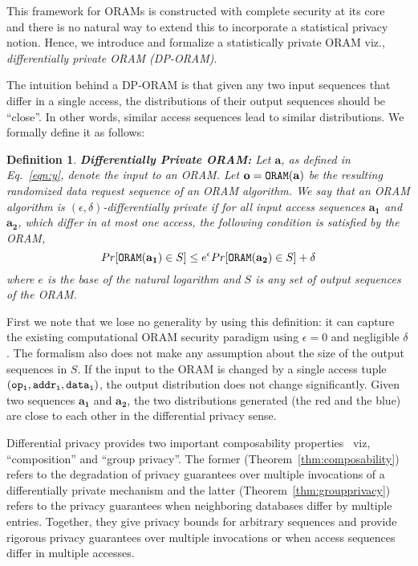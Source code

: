 \documentclass[USenglish,oneside,twocolumn]{article}
\makeatletter
\let\origsubsection\subsection
\renewcommand\subsection{\@ifstar{\starsubsection}{\nostarsubsection}}
\newcommand\nostarsubsection[1]
{\subsectionprelude\origsubsection{#1}\subsectionpostlude}
\newcommand\starsubsection[1]
{\subsectionprelude\origsubsection*{#1}\subsectionpostlude}
\newcommand\subsectionprelude{\vspace{-1.5em}}
\newcommand\subsectionpostlude{\vspace{-1em}}
\newtheorem{defn}{Definition}
\makeatother
\begin{document}
This framework for ORAMs is constructed with complete security at its core~\cite{pathoram,ringoram,gentryoramSC,burstoram} and there is no natural way to extend this to incorporate a statistical privacy notion. Hence, we introduce and formalize a statistically private ORAM viz., \emph{differentially private ORAM (DP-ORAM)}. 






\subsection{Formalizing DP-ORAM}

The intuition behind a DP-ORAM is that given any two input sequences that differ in a single access, the distributions of their output sequences should be ``close''. In other words, similar access sequences lead to similar distributions. We formally define it as follows:

\begin{defn}
\textbf{Differentially Private ORAM: } \textit{Let $\mathbf{a}$, as defined in Eq.~\ref{eqn:y}, denote the input to an ORAM. Let ${\mathbf{o} = \tt ORAM(\mathbf{a})}$ be the resulting randomized data request sequence of an ORAM algorithm. We say that an ORAM algorithm is $(\epsilon,\delta)$-differentially private if for all input access sequences $\mathbf{a_1}$ and $\mathbf{a_2}$, which differ in at most one access, the following condition is satisfied by the ORAM,
\begin{equation}\label{eqn:DPoram}
Pr[{\tt ORAM(\mathbf{a_1})} \in S] \leq e^{\epsilon} Pr[{\tt ORAM(\mathbf{a_2})} \in S] + \delta 
\end{equation}
where $e$ is the base of the natural logarithm and $S$ is any set of output sequences of the ORAM.}
\end{defn}

First we note that we lose no generality by using this definition: it can capture the existing computational ORAM security paradigm using $\epsilon = 0$ and negligible $\delta$. The formalism also does not make any assumption about the size of the output sequences in $S$. If the input to the ORAM is changed by a single access tuple ${\tt (op_{i},addr_{i},data_{i})}$, the output distribution does not change significantly. 
Given two sequences $\mathbf{a_1}$ and $\mathbf{a_2}$, the two distributions generated (the red and the blue) are close to each other in the differential privacy sense.

Differential privacy provides two important composability properties~\cite{differentialprivacy} viz, ``composition'' and ``group privacy''. The former (Theorem~\ref{thm:composability}) refers to the degradation of privacy guarantees over multiple invocations of a differentially private mechanism and the latter (Theorem~\ref{thm:groupprivacy}) refers to the privacy guarantees when neighboring databases differ by multiple entries. Together, they give privacy bounds for arbitrary sequences and provide rigorous privacy guarantees over multiple invocations or when access sequences differ in multiple accesses.
\end{document}
